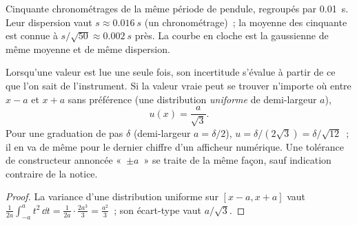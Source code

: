\begin{omfigure}

{\small Cinquante chronométrages de la même période de pendule,
regroupés par \qty{0.01}{s}. Leur dispersion vaut
$s \approx \qty{0.016}{s}$ (un chronométrage)~; la moyenne des cinquante
est connue à $s/\sqrt{50} \approx \qty{0.002}{s}$ près. La courbe en
cloche est la gaussienne de même moyenne et de même dispersion.}
\end{omfigure}

\begin{proposition}\label{prop:b1:units-dimensions:typeB}
Lorsqu'une valeur est lue une seule fois, son incertitude s'évalue à
partir de ce que l'on sait de l'instrument. Si la valeur vraie peut se
trouver n'importe où entre $x - a$ et $x + a$ sans préférence (une
distribution \emph{uniforme} de demi-largeur $a$),
\[
u(x) = \frac{a}{\sqrt 3} .
\]
Pour une graduation de pas $\delta$ (demi-largeur $a = \delta/2$),
$u = \delta/(2\sqrt3) = \delta/\sqrt{12}$~; il en va de même pour le
dernier chiffre d'un afficheur numérique. Une tolérance de constructeur
annoncée «~$\pm a$~» se traite de la même façon, sauf indication
contraire de la notice.
\end{proposition}

\begin{proof}
La variance d'une distribution uniforme sur $[x - a, x + a]$ vaut
$\frac{1}{2a}\int_{-a}^{a} t^2\,\dd t = \frac{1}{2a}\cdot\frac{2a^3}{3}
= \frac{a^2}{3}$~; son écart-type vaut $a/\sqrt3$.
\end{proof}

